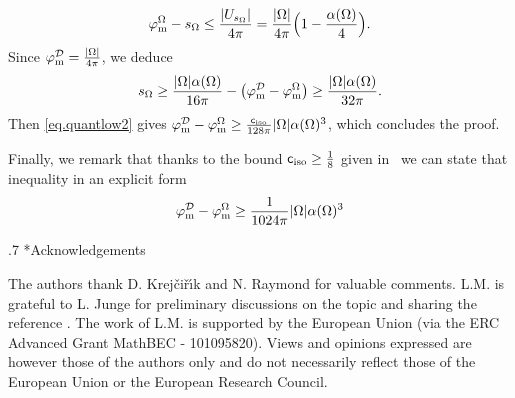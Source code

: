 \documentclass[11pt,a4paper]{amsart}
\makeatletter
\def\section{\@startsection{section}{1}\z@{.9\linespacing\@plus\linespacing}%
	{.7\linespacing} {\fontsize{13}{14}\selectfont\bfseries\centering}}
\numberwithin{figure}{section}
\numberwithin{equation}{section}
\theoremstyle{plain}%
\theoremstyle{remark}
\theoremstyle{plain}
\newcommand\cD{\mathcal D}
\newcommand\cF{\mathcal F}
\def\cD{{\mathcal D}}   \def\cE{{\mathcal E}}   \def\cF{{\mathcal F}}
\makeatother
\begin{document}
\begin{appendix}
\begin{itemize}
			\[ \varphi_{\rm m}^\Omega - s_\Omega \leq \frac{|U_{s_\Omega}|}{4\pi} = \frac{|\Omega|}{4\pi} \Big( 1 - \frac{\alpha(\Omega)}{4} \Big).\]
			Since $\varphi_{\rm m}^{\cD} = \frac{|\Omega|}{4\pi}$, we deduce
			\[ s_\Omega \geq \frac{|\Omega| \alpha(\Omega)}{16\pi} - \big( \varphi^{\cD}_{\rm m} - \varphi^\Omega_{\rm m} \big) \geq \frac{|\Omega| \alpha(\Omega)}{32\pi}. \]
			Then \eqref{eq.quantlow2} gives $\varphi_{\rm m}^{\cD} - \varphi_{\rm m}^\Omega \geq \frac{\mathsf c_{\rm iso}}{128 \pi} |\Omega| \alpha(\Omega)^3$, which concludes the proof.
		\end{itemize}
		Finally, we remark that thanks to the bound $\mathsf c_{\rm iso} \ge \frac{1}{8}$ given in~\cite[Theorem 1]{LZDJ15} we can state that inequality in an explicit form
		\[
		\varphi_{\rm m}^{\cD} - \varphi_{\rm m}^\Omega \geq \frac{1}{1024 \pi} |\Omega| \alpha(\Omega)^3
	\]
\end{appendix}

\section*{Acknowledgements}

The authors thank D. Krej{\v{c}}i{\v{r}}{\'{\i}}k and N. Raymond for valuable comments. L.M. is grateful to L. Junge for preliminary discussions on the topic and sharing the reference \cite{baur}.
The work of L.M. is supported by the European Union (via the ERC Advanced Grant MathBEC - 101095820). Views and opinions expressed are however those of the authors only and do not necessarily reflect those of the European Union or the European Research Council.
\end{document}
